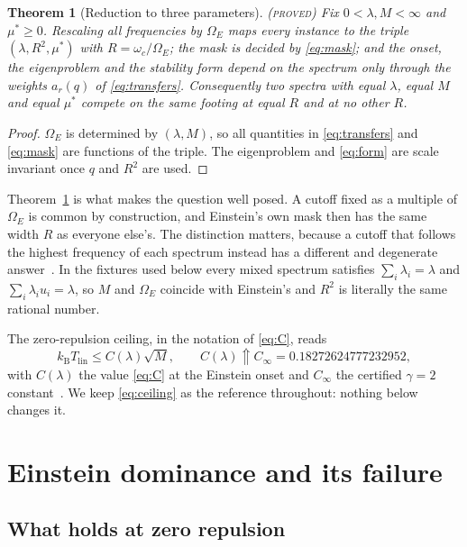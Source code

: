 \documentclass[11pt]{article}
\newcommand{\kb}{k_{\mathrm B}}
\newcommand{\Tlin}{T_{\mathrm{lin}}}
\newcommand{\OmE}{\Omega_E}
\newcommand{\muS}{\mu^{*}}
\newtheorem{theorem}{Theorem}[section]
\theoremstyle{definition}
\theoremstyle{remark}
\newcommand{\proved}{\textnormal{\textsc{(proved)}}}
\begin{document}
\begin{theorem}[Reduction to three parameters]\label{thm:reduce}\proved
Fix $0<\lambda,M<\infty$ and $\muS\ge0$. Rescaling all frequencies by $\OmE$ maps every
instance to the triple $(\lambda,R^2,\muS)$ with $R=\omega_c/\OmE$; the mask is decided by
\eqref{eq:mask}; and the onset, the eigenproblem and the stability form depend on the
spectrum only through the weights $a_r(q)$ of \eqref{eq:transfers}. Consequently two
spectra with equal $\lambda$, equal $M$ and equal $\muS$ compete on the same footing at
equal $R$ and at no other $R$.
\end{theorem}
\begin{proof}
$\OmE$ is determined by $(\lambda,M)$, so all quantities in \eqref{eq:transfers} and
\eqref{eq:mask} are functions of the triple. The eigenproblem and \eqref{eq:form} are
scale invariant once $q$ and $R^2$ are used.
\end{proof}

Theorem~\ref{thm:reduce} is what makes the question well posed. A cutoff fixed as a
multiple of $\OmE$ is common by construction, and Einstein's own mask then has the same
width $R$ as everyone else's. The distinction matters, because a cutoff that follows the
highest frequency of each spectrum instead has a different and degenerate
answer~\cite{rens,finiteband}. In the fixtures used below every mixed spectrum satisfies
$\sum_i\lambda_i=\lambda$ and $\sum_i\lambda_iu_i=\lambda$, so $M$ and $\OmE$ coincide with
Einstein's and $R^2$ is literally the same rational number.

The zero-repulsion ceiling, in the notation of \eqref{eq:C}, reads
\begin{equation}\label{eq:ceiling}
\kb\Tlin\le C(\lambda)\sqrt M,\qquad C(\lambda)\Uparrow C_\infty=0.18272624777232952,
\end{equation}
with $C(\lambda)$ the value \eqref{eq:C} at the Einstein onset and $C_\infty$ the
certified $\gamma=2$ constant~\cite{gamma,finiteband}. We keep \eqref{eq:ceiling} as the
reference throughout: nothing below changes it.

\section{Einstein dominance and its failure}\label{sec:dom}

\subsection{What holds at zero repulsion}
\end{document}
